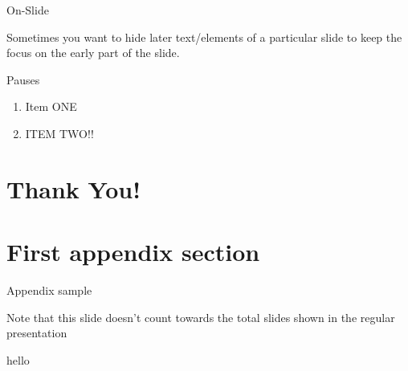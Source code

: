\documentclass[12pt]{beamer}
\begin{document}
\begin{frame}{On-Slide}

	Sometimes you want to hide later text/elements of a particular slide to keep the focus on the early part of the slide.

	\bigskip


\end{frame}
\begin{frame}{Pauses}
\begin{enumerate}
\item Item ONE
\pause
\item ITEM TWO!! 
\end{enumerate}
\end{frame}


\appendix

\section{Thank You!}
{\BackgroundShaded
\begin{frame}
\end{frame}
}






\section{First appendix section}

\begin{frame}{Appendix sample}

	Note that this slide doesn't count towards the total slides shown in the regular presentation

\end{frame}

\begin{frame}{hello}
    
\end{frame}

\end{document}
